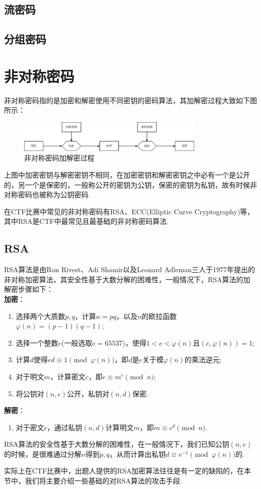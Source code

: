 \documentclass{article}
\numberwithin{equation}{subsubsection}
\begin{document}
\subsection{流密码}
\subsection{分组密码}

\newpage
\section{非对称密码}
非对称密码指的是加密和解密使用不同密钥的密码算法，其加解密过程大致如下图所示：\par
\begin{figure}[h]
    \centering
    \includegraphics[width=0.8\textwidth]{Picture/Asymmetric.png}
    \caption{非对称密码加解密过程}
\end{figure}\par
上图中加密密钥与解密密钥不相同，在加密密钥和解密密钥之中必有一个是公开的，另一个是保密的，一般称公开的密钥为公钥，保密的密钥为私钥，故有时候非对称密码也被称为公钥密码.\par
在CTF比赛中常见的非对称密码有RSA、ECC(Elliptic Curve Cryptography)等，其中RSA是CTF中最常见且最基础的非对称密码算法.
\subsection{RSA}
RSA算法是由Ron Rivest、Adi Shamir以及Leonard Adleman三人于1977年提出的非对称加密算法，其安全性基于大数分解的困难性，一般情况下，RSA算法的加解密步骤如下：\\
\textbf{加密}：\par
\begin{enumerate}
    \item 选择两个大质数$p,q$，计算$n=pq$，以及$n$的欧拉函数$\varphi(n)=(p-1)(q-1)$;
    \item 选择一个整数$e$(一般选取$e=65537$)，使得$1<e<\varphi(n)$且$(e,\varphi(n))=1$;
    \item 计算$d$使得$ed\equiv 1\pmod{\varphi(n)}$，即$d$是$e$关于模$\varphi(n)$的乘法逆元;
    \item 对于明文$m$，计算密文$c$，即$c\equiv m^e\pmod{n}$;
    \item 将公钥对$(n,e)$公开，私钥对$(n,d)$保密.
\end{enumerate}
\textbf{解密}：\par
\begin{enumerate}
    \item 对于密文$c$，通过私钥$(n,d)$计算明文$m$，即$m\equiv c^d\pmod{n}$.
\end{enumerate}
RSA算法的安全性基于大数分解的困难性，在一般情况下，我们已知公钥$(n,e)$的时候，是很难通过分解$n$得到$p,q$，从而计算出私钥$d\equiv e^{-1}\pmod{\varphi(n)}$的.\par
实际上在CTF比赛中，出题人提供的RSA加密算法往往是有一定的缺陷的，在本节中，我们将主要介绍一些基础的对RSA算法的攻击手段.
\end{document}
